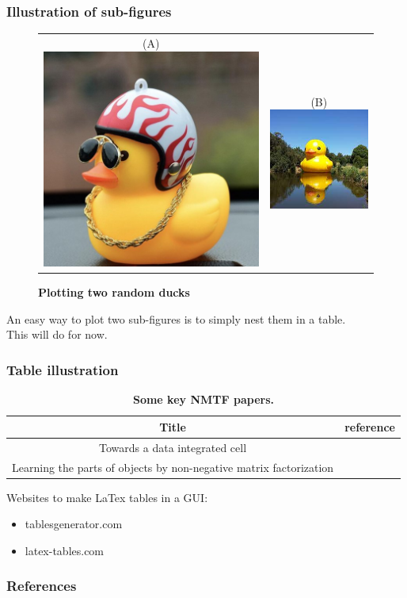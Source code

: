 \documentclass[aspectratio=169]{beamer} %
\begin{document}
\begin{frame}[t]
	\frametitle{Illustration of sub-figures}
	\begin{figure}[htpb]
		\centering
		\begin{tabular}{cc}
			(A) \includegraphics[width=0.28\linewidth]{duck_a.jpeg} &
			(B) \includegraphics[width=0.28\linewidth]{duck_b.jpeg} \\
		\end{tabular}
		\caption{{\bf Plotting two random ducks}}%
	\end{figure}
	An easy way to plot two sub-figures is to simply nest them in a table.\\
	This will do for now.
	
\end{frame}

\begin{frame}[c]
	\frametitle{Table illustration}

	\begin{table}[htpb]
		\centering
		\begin{tabular}{|c|c|}
			\hline
			{\bf Title} 								& {\bf reference} 	 \\
			\hline
			Towards a data integrated cell 						& \cite{malod2019towards}\\
			Learning the parts of objects by non-negative matrix factorization 	& \cite{Lee1999}	 \\
			\hline
		\end{tabular}
		\caption{{\bf Some key NMTF papers.}}
	\end{table}	
	Websites to make LaTex tables in a GUI:
	\begin{itemize}
		\item tablesgenerator.com 
		\item latex-tables.com
	\end{itemize}
\end{frame}

\begin{frame}[t, allowframebreaks] %
	\frametitle{References}
	
	\printbibliography

\end{frame}
\end{document}
